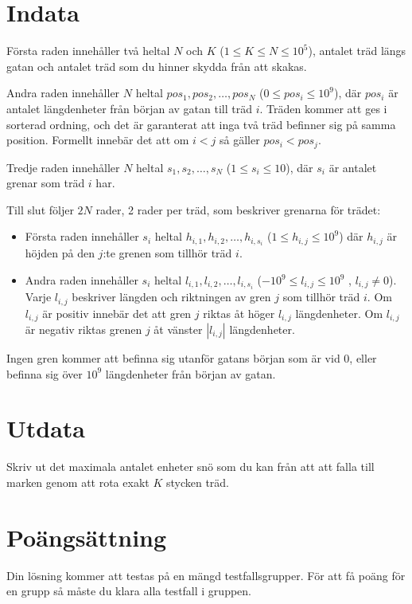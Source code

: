 \section*{Indata}
Första raden innehåller två heltal $N$ och $K$ ($1 \leq K \leq N \leq 10^5$), antalet 
träd längs gatan och antalet träd som du hinner skydda från att skakas.

Andra raden innehåller $N$ heltal $pos_1, pos_2, \dots, pos_N$ ($0 \leq pos_i \leq 10^9$), där $pos_i$ är antalet längdenheter från början av gatan till träd $i$. 
Träden kommer att ges i sorterad ordning, och det är garanterat att inga två träd befinner sig på samma position. Formellt innebär det att om $i<j$ så gäller $pos_i < pos_j$.

Tredje raden innehåller $N$ heltal $s_1, s_2, \dots, s_N$ ($1 \leq s_i \leq 10$), där $s_i$ är antalet grenar som träd $i$ har. 

Till slut följer $2N$ rader, 2 rader per träd, som beskriver grenarna för trädet:
\begin{itemize}
  \item Första raden innehåller $s_i$ heltal $h_{i,1}, h_{i,2}, \dots, h_{i,s_i}$ ($1 \leq h_{i,j} \leq 10^9$) där $h_{i,j}$ är höjden på den $j$:te grenen som tillhör träd $i$. 
  \item Andra raden innehåller $s_i$ heltal $l_{i,1}, l_{i,2}, \dots, l_{i,s_i}$ ($-10^9 \leq l_{i,j} \leq 10^9$ , $l_{i,j} \neq 0$). 
  Varje $l_{i,j}$ beskriver längden och riktningen av gren $j$ som tillhör träd $i$. Om $l_{i,j}$ är positiv innebär det att gren $j$ riktas åt höger $l_{i,j}$ längdenheter. 
  Om $l_{i,j}$ är negativ riktas grenen $j$ åt vänster $|l_{i,j}|$ längdenheter.
\end{itemize}

Ingen gren kommer att befinna sig utanför gatans början som är vid $0$, eller befinna sig över $10^9$ längdenheter från början av gatan. 


\section*{Utdata}
Skriv ut det maximala antalet enheter snö som du kan från att att falla till marken genom att rota exakt $K$ stycken träd.

\section*{Poängsättning}
Din lösning kommer att testas på en mängd testfallsgrupper.
För att få poäng för en grupp så måste du klara alla testfall i gruppen.

